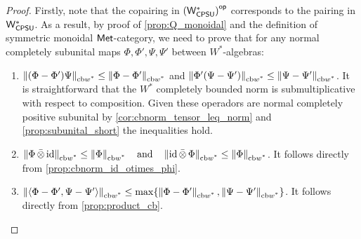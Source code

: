 \begin{proof}

  Firstly, note that the copairing in $\left(\mathsf{W^*_{CPSU}}\right)^{\mathsf{op}}$ corresponds to the pairing in $\mathsf{W^*_{CPSU}}$. As a result, by proof of \autoref{prop:Q_monoidal} and the definition of  symmetric monoidal $\mathsf{Met}$-category, we need to prove that for any normal completely subunital maps $\Phi,\Phi',\Psi,\Psi' $ between $W^*$-algebras:
  \begin{enumerate}
    \item $\left\lVert (\Phi - \Phi')\Psi \right\rVert_{\text{cb$w^*$}} \leq \left\lVert \Phi - \Phi' \right\rVert_{\text{cb$w^*$}}  $ and  $\left\lVert \Phi'(\Psi - \Psi') \right\rVert_{\text{cb$w^*$}} \leq \left\lVert \Psi - \Psi' \right\rVert_{\text{cb$w^*$}}$. 
     It is straightforward that the $W^*$ completely bounded norm is submultiplicative with respect to composition. Given these operadors are normal completely positive subunital by \autoref{cor:cbnorm_tensor_leq_norm} and \autoref{prop:subunital_short} the inequalities hold.
     \item $\left\lVert \Phi \,\bar{\otimes} \, \mathrm{id} \right\rVert_{\text{cb$w^*$}} \leq \left\lVert \Phi \right\rVert_{\text{cb$w^*$}} \quad \text{and} \quad  \left\lVert \mathrm{id}\,\bar{\otimes} \, \Phi \right\rVert_{\text{cb$w^*$}} \leq \left\lVert \Phi \right\rVert_{\text{cb$w^*$}}$. It follows directly from \autoref{prop:cbnorm_id_otimes_phi}.
     \item $\left\lVert \langle \Phi - \Phi' , \Psi- \Psi' \rangle \right\rVert_{\text{cb$w^*$}} \leq \max \{\left\lVert  \Phi - \Phi' \right\rVert_{\text{cb$w^*$}}, \left\lVert \Psi- \Psi' \right\rVert_{\text{cb$w^*$}}\}$. It follows directly from \autoref{prop:product_cb}.
  \end{enumerate}

\end{proof}


